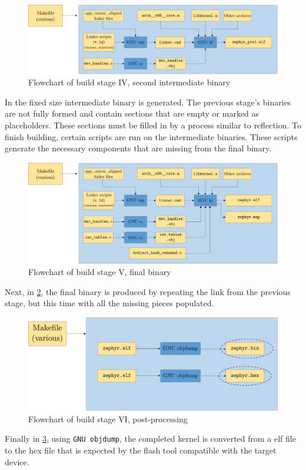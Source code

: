 \begin{figure}[htbp]
	\centering
	\includegraphics[width=.8\textwidth]{Figures/3_cmake_build4.pdf}
	\caption[Flowchart of build stage IV, second intermediate binary]{Flowchart of build stage IV, second intermediate binary}
	\label{fig:3_build4}
\end{figure}
In  the fixed size intermediate binary is generated. The previous stage's binaries are not fully formed and contain sections that are empty or marked as placeholders. These sections must be filled in by a process similar to reflection. To finish building, certain scripts are run on the intermediate binaries. These scripts generate the necessary components that are missing from the final binary.
\begin{figure}[htbp]
	\centering
	\includegraphics[width=.8\textwidth]{Figures/3_cmake_build5.pdf}
	\caption[Flowchart of build stage V, final binary]{Flowchart of build stage V, final binary}
	\label{fig:3_build5}
\end{figure}
Next, in \cref{fig:3_build5}, the final binary is produced by repeating the link from the previous stage, but this time with all the missing pieces populated.
\begin{figure}[htbp]
	\centering
	\includegraphics[width=.6\textwidth]{Figures/3_cmake_build6.pdf}
	\caption[Flowchart of build stage VI, post-processing]{Flowchart of build stage VI, post-processing}
	\label{fig:3_build6}
\end{figure}
Finally in \cref{fig:3_build6}, using \texttt{GNU objdump}, the completed kernel is converted from a \gls{elf} file to the hex file that is expected by the flash tool compatible with the target device.


